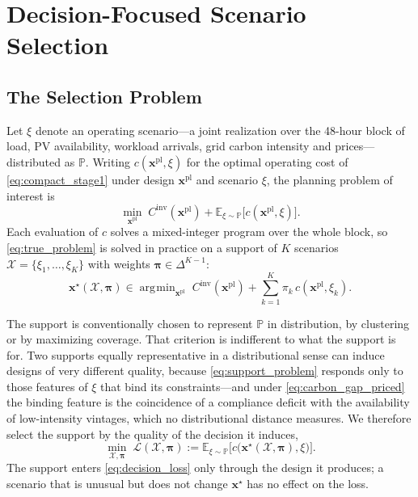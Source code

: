 \documentclass[journal]{IEEEtran}
\DeclareMathOperator*{\argmin}{\arg\!\min}
\begin{document}
\section{Decision-Focused Scenario Selection}
\label{sec:dfl}

\subsection{The Selection Problem}
\label{sec:selection_problem}

Let $\xi$ denote an operating scenario---a joint realization over the
48-hour block of load, PV availability, workload arrivals, grid carbon
intensity and prices---distributed as $\mathbb{P}$. Writing
$c(\boldsymbol{x}^{\mathrm{pl}},\xi)$ for the optimal operating cost of
\eqref{eq:compact_stage1} under design $\boldsymbol{x}^{\mathrm{pl}}$ and
scenario $\xi$, the planning problem of interest is
\begin{equation}
\min_{\boldsymbol{x}^{\mathrm{pl}}}
\;
C^{\mathrm{inv}}(\boldsymbol{x}^{\mathrm{pl}})
+\mathbb{E}_{\xi\sim\mathbb{P}}
\bigl[c(\boldsymbol{x}^{\mathrm{pl}},\xi)\bigr].
\label{eq:true_problem}
\end{equation}
Each evaluation of $c$ solves a mixed-integer program over the whole
block, so \eqref{eq:true_problem} is solved in practice on a support of
$K$ scenarios $\mathcal{X}=\{\xi_1,\dots,\xi_K\}$ with weights
$\boldsymbol{\pi}\in\Delta^{K-1}$:
\begin{equation}
\boldsymbol{x}^{\star}(\mathcal{X},\boldsymbol{\pi})
\in
\argmin_{\boldsymbol{x}^{\mathrm{pl}}}
\;
C^{\mathrm{inv}}(\boldsymbol{x}^{\mathrm{pl}})
+\sum_{k=1}^{K}\pi_k\,c(\boldsymbol{x}^{\mathrm{pl}},\xi_k).
\label{eq:support_problem}
\end{equation}

The support is conventionally chosen to represent $\mathbb{P}$ in
distribution, by clustering or by maximizing coverage. That criterion is
indifferent to what the support is for. Two supports equally
representative in a distributional sense can induce designs of very
different quality, because \eqref{eq:support_problem} responds only to
those features of $\xi$ that bind its constraints---and under
\eqref{eq:carbon_gap_priced} the binding feature is the coincidence of a
compliance deficit with the availability of low-intensity vintages, which
no distributional distance measures. We therefore select the support by
the quality of the decision it induces,
\begin{equation}
\min_{\mathcal{X},\boldsymbol{\pi}}
\;
\mathcal{L}(\mathcal{X},\boldsymbol{\pi})
:=
\mathbb{E}_{\xi\sim\mathbb{P}}
\bigl[
c\bigl(\boldsymbol{x}^{\star}(\mathcal{X},\boldsymbol{\pi}),\xi\bigr)
\bigr].
\label{eq:decision_loss}
\end{equation}
The support enters \eqref{eq:decision_loss} only through the design it
produces; a scenario that is unusual but does not change
$\boldsymbol{x}^{\star}$ has no effect on the loss.
\end{document}
